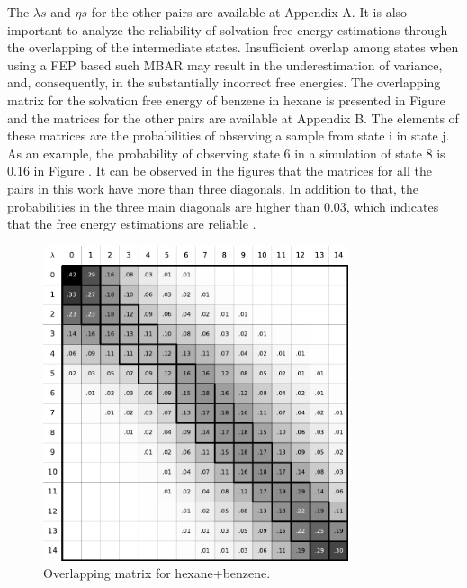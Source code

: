 The $\lambda s$ and $\eta s$  for the other pairs are available at  Appendix A. It is also important to analyze the reliability of solvation free energy estimations  through the overlapping of the intermediate states. Insufficient overlap among states when using a FEP based such MBAR may result in the underestimation of variance, and, consequently, in the substantially incorrect free energies. The overlapping matrix for the solvation free energy of benzene in hexane is presented in Figure  and the matrices for the other pairs are available at Appendix B. The elements of these matrices are the probabilities of observing a sample from state  i in state j. As an example, the probability of observing state 6 in a simulation of state 8 is 0.16 in Figure . It can be observed in the figures that  the matrices for all the pairs in this work have more than  three diagonals. In addition to that,  the probabilities in the three main diagonals are higher than 0.03, which indicates that the free energy estimations are reliable \cite{klimovich}.   

\begin{figure}[H]
	\centering
	\includegraphics[width=0.8\textwidth]{Figures/ohex_benz}
	\caption{Overlapping matrix for hexane+benzene.}
    \label{fig:hexove}
\end{figure}

